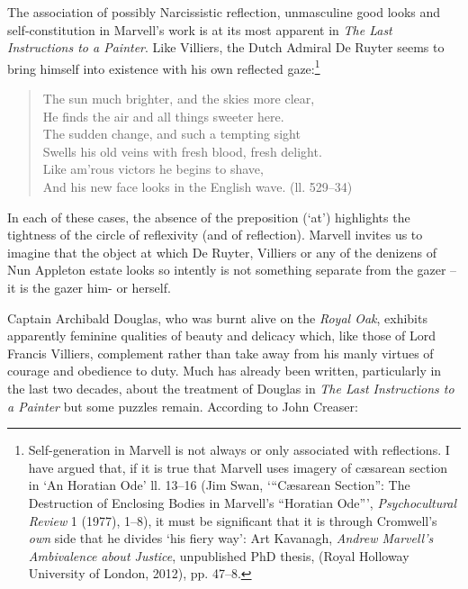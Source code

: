 ﻿\documentclass[12pt]{article}
\newcommand{\citedtitle}[1]{\textit{#1}}
\begin{document}
The
association of possibly Narcissistic reflection, unmasculine good looks and
self-constitution in Marvell’s work is at its most apparent in \citedtitle{The
Last Instructions to a Painter}. Like Villiers, the Dutch Admiral De Ruyter seems to
bring himself into existence with his own reflected gaze:\footnote{Self-generation in Marvell is not always or only associated with reflections. I have argued that, if it is true that Marvell uses imagery of cæsarean section in  ‘An Horatian
Ode’ ll. 13–16 (Jim Swan, ‘“Cæsarean Section”: The Destruction of Enclosing Bodies in Marvell’s “Horatian Ode”’, \citedtitle{Psychocultural Review} 1 (1977), 1–8), it must
be significant that it is through Cromwell’s \emph{own} side that he divides ‘his fiery way’: Art Kavanagh, \citedtitle{Andrew Marvell’s Ambivalence about Justice}, unpublished PhD
thesis, (Royal Holloway University of London, 2012), pp. 47–8.}

\begin{verse}
The sun much brighter, and the skies more clear,\\
He finds the air and all things sweeter here.\\
The sudden change, and such a tempting sight\\
Swells his old veins with fresh blood, fresh delight.\\
Like am’rous victors he begins to shave,\\
And his new face looks in the English wave. (ll. 529–34)
\end{verse}
In each of these cases, the absence of the preposition (‘at’) highlights the
tightness of the circle of reflexivity (and of reflection). Marvell invites us
to imagine that the object at which De Ruyter, Villiers or any of the denizens
of Nun Appleton estate looks so intently is not something separate from the
gazer – it is the gazer him- or herself.

Captain
Archibald Douglas, who was burnt alive on the \textit{Royal Oak}, exhibits apparently
feminine qualities of beauty and delicacy which, like those of Lord Francis
Villiers, complement rather than take away from his manly virtues of courage
and obedience to duty. Much has already been written, particularly in the last
two decades, about the treatment of Douglas in \citedtitle{The Last Instructions to
a Painter} but some puzzles remain. According to John Creaser:
\end{document}
